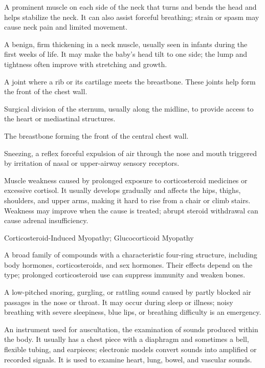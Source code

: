  A prominent muscle on each side of the neck that turns and bends the head and helps stabilize the neck. It can also assist forceful breathing; strain or spasm may cause neck pain and limited movement.

 A benign, firm thickening in a neck muscle, usually seen in infants during the first weeks of life. It may make the baby's head tilt to one side; the lump and tightness often improve with stretching and growth.

 A joint where a rib or its cartilage meets the breastbone. These joints help form the front of the chest wall.

 Surgical division of the sternum, usually along the midline, to provide access to the heart or mediastinal structures.

 The breastbone forming the front of the central chest wall.

 Sneezing, a reflex forceful expulsion of air through the nose and mouth triggered by irritation of nasal or upper-airway sensory receptors.

 Muscle weakness caused by prolonged exposure to corticosteroid medicines or excessive cortisol. It usually develops gradually and affects the hips, thighs, shoulders, and upper arms, making it hard to rise from a chair or climb stairs. Weakness may improve when the cause is treated; abrupt steroid withdrawal can cause adrenal insufficiency.

\synonyms
Corticosteroid-Induced Myopathy; Glucocorticoid Myopathy

 A broad family of compounds with a characteristic four-ring structure, including body hormones, corticosteroids, and sex hormones. Their effects depend on the type; prolonged corticosteroid use can suppress immunity and weaken bones.

 A low-pitched snoring, gurgling, or rattling sound caused by partly blocked air passages in the nose or throat. It may occur during sleep or illness; noisy breathing with severe sleepiness, blue lips, or breathing difficulty is an emergency.

 An instrument used for auscultation, the examination of sounds produced within the body. It usually has a chest piece with a diaphragm and sometimes a bell, flexible tubing, and earpieces; electronic models convert sounds into amplified or recorded signals. It is used to examine heart, lung, bowel, and vascular sounds.

